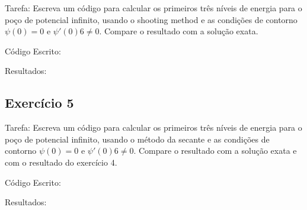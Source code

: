 \documentclass[12pt, a4paper]{article} %
\begin{document}
        Tarefa: Escreva um c\'odigo para calcular os primeiros tr\^es n\'iveis de energia para o po\c{c}o de potencial inﬁnito, usando o shooting method e as condi\c{c}\~oes de contorno $\psi(0) = 0$ e
        $\psi '(0) 6 \neq  0$. Compare o resultado com a solu\c{c}\~ao exata.

        C\'odigo Escrito:
        

        Resultados:

    

    \subsection{Exerc\'icio 5}

        Tarefa: Escreva um c\'odigo para calcular os primeiros tr\^es n\'iveis de energia para o po\c{c}o de potencial inﬁnito, usando o m\'etodo da secante e as condi\c{c}\~oes de contorno $\psi(0) = 0$ e
        $\psi '(0) 6 \neq  0$. Compare o resultado com a solu\c{c}\~ao exata e com o resultado do exerc\'icio 4.

        C\'odigo Escrito:
        

        Resultados:
        
\end{document}
